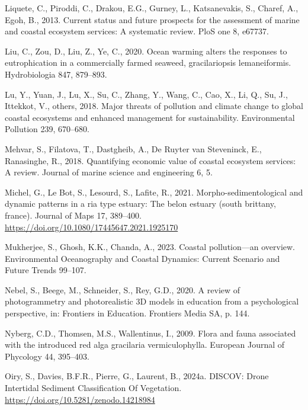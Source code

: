 \documentclass[
  letterpaper,
  DIV=11,
  numbers=noendperiod]{scrartcl}
\newlength{\cslhangindent}
\newenvironment{CSLReferences}[2] %
 {\begin{list}{}{%
  \setlength{\itemindent}{0pt}
  \setlength{\leftmargin}{0pt}
  \setlength{\parsep}{0pt}
  \ifodd #1
   \setlength{\leftmargin}{\cslhangindent}
   \setlength{\itemindent}{-1\cslhangindent}
  \fi
  \setlength{\itemsep}{#2\baselineskip}}}
 {\end{list}}
\begin{document}
\begin{CSLReferences}{1}{0}
Liquete, C., Piroddi, C., Drakou, E.G., Gurney, L., Katsanevakis, S.,
Charef, A., Egoh, B., 2013. Current status and future prospects for the
assessment of marine and coastal ecosystem services: A systematic
review. PloS one 8, e67737.

Liu, C., Zou, D., Liu, Z., Ye, C., 2020. Ocean warming alters the
responses to eutrophication in a commercially farmed seaweed,
gracilariopsis lemaneiformis. Hydrobiologia 847, 879--893.

Lu, Y., Yuan, J., Lu, X., Su, C., Zhang, Y., Wang, C., Cao, X., Li, Q.,
Su, J., Ittekkot, V., others, 2018. Major threats of pollution and
climate change to global coastal ecosystems and enhanced management for
sustainability. Environmental Pollution 239, 670--680.

Mehvar, S., Filatova, T., Dastgheib, A., De Ruyter van Steveninck, E.,
Ranasinghe, R., 2018. Quantifying economic value of coastal ecosystem
services: A review. Journal of marine science and engineering 6, 5.

Michel, G., Le Bot, S., Lesourd, S., Lafite, R., 2021.
Morpho-sedimentological and dynamic patterns in a ria type estuary: The
belon estuary (south brittany, france). Journal of Maps 17, 389--400.
\url{https://doi.org/10.1080/17445647.2021.1925170}

Mukherjee, S., Ghosh, K.K., Chanda, A., 2023. Coastal pollution---an
overview. Environmental Oceanography and Coastal Dynamics: Current
Scenario and Future Trends 99--107.

Nebel, S., Beege, M., Schneider, S., Rey, G.D., 2020. A review of
photogrammetry and photorealistic 3D models in education from a
psychological perspective, in: Frontiers in Education. Frontiers Media
SA, p. 144.

Nyberg, C.D., Thomsen, M.S., Wallentinus, I., 2009. Flora and fauna
associated with the introduced red alga gracilaria vermiculophylla.
European Journal of Phycology 44, 395--403.

Oiry, S., Davies, B.F.R., Pierre, G., Laurent, B., 2024a. {DISCOV: Drone
Intertidal Sediment Classification Of Vegetation}.
\url{https://doi.org/10.5281/zenodo.14218984}


\end{CSLReferences}
\end{document}
